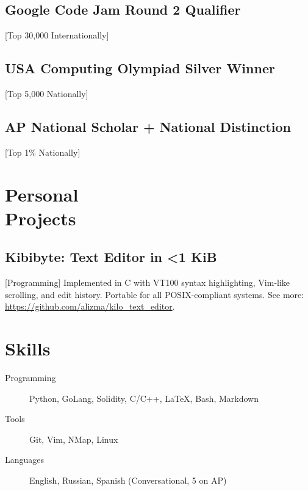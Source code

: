 \documentclass{mycv}
\begin{document}
\subsection{Google Code Jam Round 2 Qualifier}[Top 30,000 Internationally]

\subsection{USA Computing Olympiad Silver Winner}[Top 5,000 Nationally]

\subsection{AP National Scholar + National Distinction}[Top 1\% Nationally]

\section{Personal \\ Projects} 

\subsection{Kibibyte: Text Editor in <1 KiB}[Programming]
Implemented in C with VT100 syntax highlighting, Vim-like scrolling, and edit history. Portable for all POSIX-compliant systems. See more: \url{https://github.com/alizma/kilo_text_editor}.

\section{Skills}

\begin{description}
  \item[Programming] Python, GoLang, Solidity,  C/C++, \LaTeX, Bash, Markdown
  \item[Tools] Git,  Vim,  NMap, Linux
  \item[Languages] English, Russian, Spanish (Conversational, 5 on AP)
\end{description}
\end{document}
